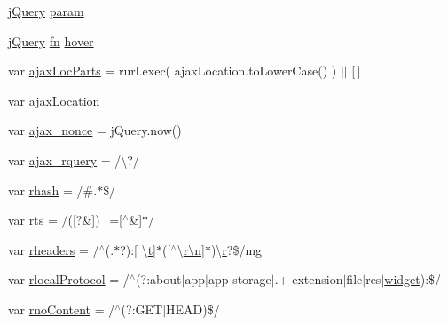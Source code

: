 \begin{DoxyCompactItemize}
\item 
\hyperlink{_site_bundle_2_resources_2public_2js_2_specific_functions_8js_ada154f66b5b2b806f5e239376e925644}{j\+Query} \hyperlink{jquery-1_89_81_8js_a24ced9cd3c9e1970a8cbe8d7adedc765}{param}
\item 
\hyperlink{_site_bundle_2_resources_2public_2js_2_specific_functions_8js_ada154f66b5b2b806f5e239376e925644}{j\+Query} \hyperlink{jquery_8mobile-1_83_81_8js_a070a098c013c19f1fbe3cec06e21420f}{fn} \hyperlink{jquery-1_89_81_8js_a8bc5a390911533398a1fc5db0a599858}{hover}
\item 
var \hyperlink{jquery-1_89_81_8js_a4c35110da3c335cfca38505ee65a5e79}{ajax\+Loc\+Parts} = rurl.\+exec( ajax\+Location.\+to\+Lower\+Case() ) $\vert$$\vert$ \mbox{[}$\,$\mbox{]}
\item 
var \hyperlink{jquery-1_89_81_8js_a1661d4e1676e7c6ffde5a3cb8d8ae246}{ajax\+Location}
\item 
var \hyperlink{jquery-1_89_81_8js_aaa43e6d4c76ee8be878dd7e93fb755a4}{ajax\+\_\+nonce} = j\+Query.\+now()
\item 
var \hyperlink{jquery-1_89_81_8js_a4da85c0011217bf1643139dc23999c5c}{ajax\+\_\+rquery} = /\textbackslash{}?/
\item 
var \hyperlink{jquery-1_89_81_8js_a6990b6955b6bec9dd39f3814cfb56d6d}{rhash} = /\#.$\ast$\$/
\item 
var \hyperlink{jquery-1_89_81_8js_a38ff30904f54277281a13514d7aea00d}{rts} = /(\mbox{[}?\&\mbox{]})\hyperlink{api_8methods_8js_a9fa21cf6b20968a71a2ed8acf4954e9e}{\+\_\+}=\mbox{[}$^\wedge$\&\mbox{]}$\ast$/
\item 
var \hyperlink{jquery-1_89_81_8js_af506d11612139f03091db71089d92e8b}{rheaders} = /$^\wedge$(.$\ast$?)\+:\mbox{[} \textbackslash{}\hyperlink{jquery_8knob_8js_aa09e7cf223942a40813c00a3897b7c48}{t}\mbox{]}$\ast$(\mbox{[}$^\wedge$\textbackslash{}\hyperlink{fullpage_2plugin_8min_8js_ab767a859d1217315f42c9bb52fc648dc}{r\textbackslash{}n}\mbox{]}$\ast$)\textbackslash{}\hyperlink{jquery_8fancybox_8pack_8js_aaa5fef39529cdffdfa257202bb4fda9f}{r}?\$/mg
\item 
var \hyperlink{jquery-1_89_81_8js_af4dd13c90298bbf53ce08ec707dc9e2a}{rlocal\+Protocol} = /$^\wedge$(?\+:about$\vert$app$\vert$app-\/storage$\vert$.+-\/extension$\vert$file$\vert$res$\vert$\hyperlink{jquery_8mobile-1_83_81_8js_ac4a01edf7e49cc35291bb23e78a07acf}{widget})\+:\$/
\item 
var \hyperlink{jquery-1_89_81_8js_a537d744d72e31ec312aa3f16ef576d3f}{rno\+Content} = /$^\wedge$(?\+:G\+E\+T$\vert$H\+E\+A\+D)\$/
\item 
$$
\end{DoxyCompactItemize}
